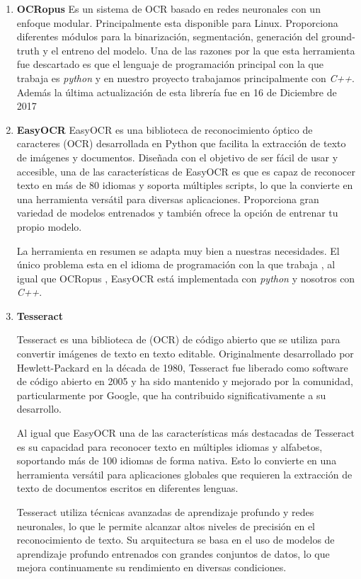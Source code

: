 \begin{enumerate}
	\item \textbf{OCRopus}
	Es un sistema de OCR basado en redes neuronales con un enfoque modular.
	Principalmente esta disponible para Linux. Proporciona diferentes módulos para la binarización, segmentación, generación del ground-truth y el entreno del modelo.
	Una de las razones por la que esta herramienta fue descartado es que el lenguaje de programación principal con la que trabaja es \emph{python} y en nuestro proyecto trabajamos principalmente con \emph{C++}. Además la última actualización de esta librería fue en 16 de Diciembre de 2017
	
	\item \textbf{EasyOCR}
	EasyOCR es una biblioteca de reconocimiento óptico de caracteres (OCR) desarrollada en Python que facilita la extracción de texto de imágenes y documentos. Diseñada con el objetivo de ser fácil de usar y accesible, una de las características de EasyOCR es que es capaz de reconocer texto en más de 80 idiomas y soporta múltiples scripts, lo que la convierte en una herramienta versátil para diversas aplicaciones.
	Proporciona gran variedad de modelos entrenados y también ofrece la opción de entrenar tu propio modelo.
	
	La herramienta en resumen se adapta muy bien a nuestras necesidades. El único problema esta en el idioma de programación con la que trabaja , al igual que OCRopus , EasyOCR está implementada con \emph{python} y nosotros con \emph{C++}.
	
	\item \textbf{Tesseract}
	
	Tesseract es una biblioteca de (OCR) de código abierto que se utiliza para convertir imágenes de texto en texto editable. Originalmente desarrollado por Hewlett-Packard en la década de 1980, Tesseract fue liberado como software de código abierto en 2005 y ha sido mantenido y mejorado por la comunidad, particularmente por Google, que ha contribuido significativamente a su desarrollo.
	
	Al igual que EasyOCR una de las características más destacadas de Tesseract es su capacidad para reconocer texto en múltiples idiomas y alfabetos, soportando más de 100 idiomas de forma nativa. Esto lo convierte en una herramienta versátil para aplicaciones globales que requieren la extracción de texto de documentos escritos en diferentes lenguas.
	
	Tesseract utiliza técnicas avanzadas de aprendizaje profundo y redes neuronales, lo que le permite alcanzar altos niveles de precisión en el reconocimiento de texto. Su arquitectura se basa en el uso de modelos de aprendizaje profundo entrenados con grandes conjuntos de datos, lo que mejora continuamente su rendimiento en diversas condiciones.
	

\end{enumerate}
